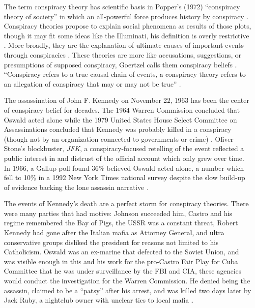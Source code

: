 The term conspiracy theory has scientific basis in Popper's (1972) ``conspiracy theory of society'' in which an all-powerful force produces history by conspiracy \cite{popper2014}.
Conspiracy theories propose to explain social phenomena as results of those plots, though it may fit some ideas like the Illuminati, his definition is overly restrictive \cite[pp. 5-7]{pidgen1995}.
More broadly, they are the explanation of ultimate causes of important events through conspiracies \cite[p. 116]{keeley1999}.
These theories are more like accusations, suggestions, or presumptions of supposed conspiracy, Goertzel calls them conspiracy beliefs \cite[p. 731]{goertzel1994}.
``Conspiracy refers to a true causal chain of events, a conspiracy theory refers to an allegation of conspiracy that may or may not be true'' \cite[p. 4]{douglas2019}.

The assassination of John F. Kennedy on November 22, 1963 has been the center of conspiracy belief for decades.
The 1964 Warren Commission concluded that Oswald acted alone while the 1979 United States House Select Committee on Assassinations concluded that Kennedy was probably killed in a conspiracy (though not by an organization connected to governments or crime) \cite{warren1964} \cite{select1979}.
Oliver Stone's blockbuster, \emph{JFK}, a conspiracy-focused retelling of the event reflected a public interest in and distrust of the official account which only grew over time. 
In 1966, a Gallup poll found 36\% believed Oswald acted alone, a number which fell to 10\% in a 1992 New York Times national survey despite the slow build-up of evidence backing the lone assassin narrative \cite[pp. 731-732]{goertzel1994}.

The events of Kennedy's death are a perfect storm for conspiracy theories.
There were many parties that had motive: Johnson succeeded him, Castro and his regime remembered the Bay of Pigs, the USSR was a constant threat, Robert Kennedy had gone after the Italian mafia as Attorney General, and ultra conservative groups disliked the president for reasons not limited to his Catholicism.
Oswald was an ex-marine that defected to the Soviet Union, and was visible enough in this and his work for the pro-Castro Fair Play for Cuba Committee that he was under surveillance by the FBI and CIA, these agencies would conduct the investigation for the Warren Commission.
He denied being the assassin, claimed to be a ``patsy'' after his arrest, and was killed two days later by Jack Ruby, a nightclub owner with unclear ties to local mafia \cite{gagne2022}.

